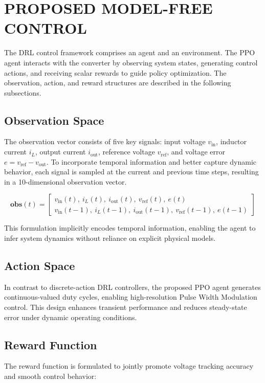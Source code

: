 \documentclass[conference]{IEEEtran}
\begin{document}
\section{PROPOSED MODEL-FREE CONTROL}

The DRL control framework comprises an agent and an environment. The PPO agent interacts with the converter by observing system states, generating control actions, and receiving scalar rewards to guide policy optimization. The observation, action, and reward structures are described in the following subsections.


\subsection{Observation Space}

The observation vector consists of five key signals: input voltage $v_{\text{in}}$, inductor current $i_L$, output current $i_{\text{out}}$, reference voltage $v_{\text{ref}}$, and voltage error $e = v_{\text{ref}} - v_{\text{out}}$. To incorporate temporal information and better capture dynamic behavior, each signal is sampled at the current and previous time steps, resulting in a 10-dimensional observation vector.


\begin{equation}
\mathbf{obs}(t) =
\begin{bmatrix}
v_{\text{in}}(t),\ i_L(t),\ i_{\text{out}}(t),\ v_{\text{ref}}(t),\ e(t) \\
v_{\text{in}}(t{-}1),\ i_L(t{-}1),\ i_{\text{out}}(t{-}1),\ v_{\text{ref}}(t{-}1),\ e(t{-}1)
\end{bmatrix}
\label{eq:obs_vector}
\end{equation}

This formulation implicitly encodes temporal information, enabling the agent to infer system dynamics without reliance on explicit physical models.

\subsection{Action Space}
In contrast to discrete-action DRL controllers, the proposed PPO agent generates continuous-valued duty cycles, enabling high-resolution Pulse Width Modulation control. This design enhances transient performance and reduces steady-state error under dynamic operating conditions.


\subsection{Reward Function}
The reward function is formulated to jointly promote voltage tracking accuracy and smooth control behavior:
\end{document}
